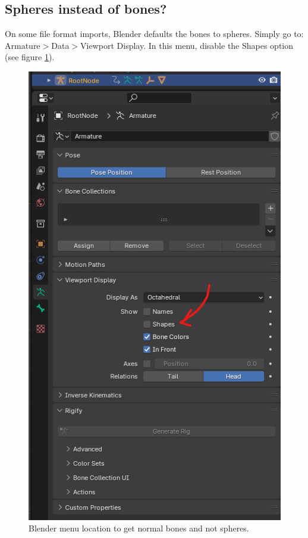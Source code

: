 \documentclass{uva-inf-article}
\begin{document}
\subsection{Spheres instead of bones?}
On some file format imports, Blender defaults the bones to spheres. Simply go to: Armature$>$Data$>$Viewport Display. In this menu, disable the Shapes option (see figure \ref{fig:boneSpheres}).
\begin{figure}[hbt!]
    \centering
    \includegraphics[height=0.5\textheight]{imgs/boneSpheres.png}
    \caption{Blender menu location to get normal bones and not spheres.}
    \label{fig:boneSpheres}
\end{figure}

\end{document}
